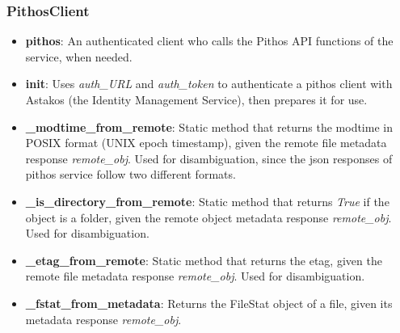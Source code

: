     \subsubsection{PithosClient}
      \begin{itemize}
        \item \textbf{pithos}: An authenticated client who calls the Pithos API functions of the service, when needed.\\
        \item \textbf{init}: Uses \emph{auth\_URL} and \emph{auth\_token} to authenticate a pithos client with Astakos (the Identity Management Service), then prepares it for use.
        \item \textbf{\_modtime\_from\_remote}: Static method that returns the modtime in POSIX format (UNIX epoch timestamp), given the remote file metadata response \emph{remote\_obj}. Used for disambiguation, since the json responses of pithos service follow two different formats.
        \item \textbf{\_is\_directory\_from\_remote}: Static method that returns \emph{True} if the object is a folder, given the remote object metadata response \emph{remote\_obj}. Used for disambiguation.
        \item \textbf{\_etag\_from\_remote}: Static method that returns the etag, given the remote file metadata response \emph{remote\_obj}. Used for disambiguation.
        \item \textbf{\_fstat\_from\_metadata}: Returns the FileStat object of a file, given its metadata response \emph{remote\_obj}.
      \end{itemize}

